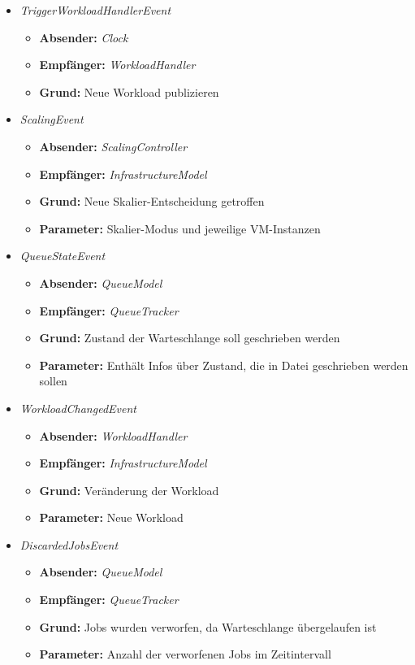 \begin{itemize}
	\item \textit{TriggerWorkloadHandlerEvent} 
\begin{itemize}
	\item \textbf{Absender:} \textit{Clock}
	\item \textbf{Empfänger:} \textit{WorkloadHandler}
	\item \textbf{Grund:} Neue Workload publizieren
\end{itemize} 

	\item \textit{ScalingEvent} 
\begin{itemize}
	\item \textbf{Absender:} \textit{ScalingController}
	\item \textbf{Empfänger:} \textit{InfrastructureModel}
	\item \textbf{Grund:} Neue Skalier-Entscheidung getroffen
	\item \textbf{Parameter:} Skalier-Modus und jeweilige VM-Instanzen
\end{itemize} 

	\item \textit{QueueStateEvent} 
\begin{itemize}
	\item \textbf{Absender:} \textit{QueueModel}
	\item \textbf{Empfänger:} \textit{QueueTracker}
	\item \textbf{Grund:} Zustand der Warteschlange soll geschrieben werden
	\item \textbf{Parameter:} Enthält Infos über Zustand, die in Datei geschrieben werden sollen
\end{itemize} 



	\item \textit{WorkloadChangedEvent} 
\begin{itemize}
	\item \textbf{Absender:} \textit{WorkloadHandler}
	\item \textbf{Empfänger:} \textit{InfrastructureModel}
	\item \textbf{Grund:} Veränderung der Workload
	\item \textbf{Parameter:} Neue Workload
\end{itemize} 

	\item \textit{DiscardedJobsEvent} 
\begin{itemize}
	\item \textbf{Absender:} \textit{QueueModel}
	\item \textbf{Empfänger:} \textit{QueueTracker}
	\item \textbf{Grund:} Jobs wurden verworfen, da Warteschlange übergelaufen ist
	\item \textbf{Parameter:} Anzahl der verworfenen Jobs im Zeitintervall
\end{itemize} 


\end{itemize}
